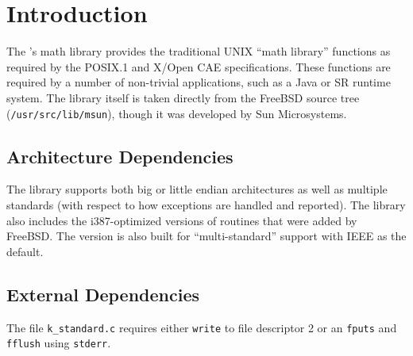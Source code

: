 %
% 
%
\label{freebsd-math}

\section{Introduction}

The \oskit's math library provides the traditional UNIX ``math
library'' functions as required by the POSIX.1 and X/Open CAE specifications.
These functions are required by a number of non-trivial applications,
such as a Java or SR runtime system.
The library itself is taken directly from the FreeBSD source tree
({\tt /usr/src/lib/msun}),
though it was developed by Sun Microsystems.


\subsection{Architecture Dependencies}
The library supports both big or little endian architectures
as well as multiple standards
(with respect to how exceptions are handled and reported).
The \oskit{} library also includes the
i387-optimized versions of routines that were added by FreeBSD\@.
The \oskit{} version is also built for ``multi-standard'' support with
IEEE as the default.


\subsection{External Dependencies}
The file \texttt{k_standard.c} requires either
{\tt write} to file descriptor 2 or
an {\tt fputs} and {\tt fflush} using {\tt stderr}.

